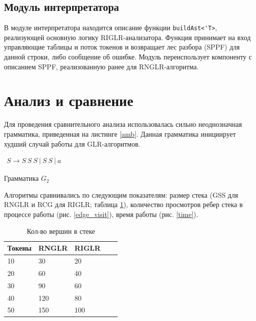 \documentclass[14pt]{matmex-diploma-custom}
\begin{document}
\subsection{Модуль интерпретатора}
В модуле интерпретатора находится описание функции \lstinline|buildAst<'T>|, реализующей основную логику RIGLR-анализатора. Функция принимает на вход управляющие таблицы и поток токенов и возвращает лес разбора (SPPF) для данной строки, либо сообщение об ошибке. Модуль переиспользует компоненту с описанием SPPF, реализованную ранее для RNGLR-алгоритма.  

\section{Анализ и сравнение}
Для проведения сравнительного анализа использовалась сильно неоднозначная грамматика, приведенная на листинге \ref{amb}. Данная грамматика инициирует худший случай работы для GLR-алгоритмов.

\begin{listing}[h]
\centering
$\begin{array}{rl}
S \rightarrow  S \ S \ S \ | \ S \ S \ | \ a
\end{array}$
\caption{Грамматика $G_2$}
\label{amb}
\end{listing}

Алгоритмы сравнивались по следующим показателям: размер стека (GSS для RNGLR и RCG для RIGLR; таблица \ref{stack_table}), количество просмотров ребер стека в процессе работы (рис. \ref{edge_visit}), время работы (рис. \ref{time}).

\begin{table}[h]
\centering
\begin{tabular}{|l|l|l|l|l|}
\hline

Токены & RNGLR                  & RIGLR        \\ \hline
10     & 30                         & 20                \\ \hline
20     & 60                         & 40                \\ \hline
30     & 90                         & 60                \\ \hline
40     & 120                        & 80                \\ \hline
50     & 150                        & 100                 \\ \hline
\end{tabular}
\caption{Кол-во вершин в стеке}
\label{stack_table}
\end{table}
\end{document}
